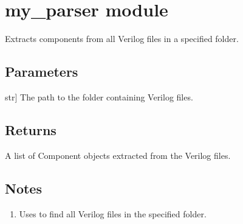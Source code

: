 \documentclass[letterpaper,10pt,english]{sphinxmanual}
\begin{document}
\sphinxstepscope


\section{my\_parser module}
\label{\detokenize{my_parser:module-my_parser}}\label{\detokenize{my_parser:my-parser-module}}\label{\detokenize{my_parser::doc}}

\begin{fulllineitems}
\label{\detokenize{my_parser:my_parser.extract_components}}
\pysigstartsignatures
{}
\pysigstopsignatures
\sphinxAtStartPar
Extracts components from all Verilog files in a specified folder.


\subsection{Parameters}
\label{\detokenize{my_parser:parameters}}\begin{description}
\sphinxlineitem{folder}{[}str{]}
\sphinxAtStartPar
The path to the folder containing Verilog files.

\end{description}


\subsection{Returns}
\label{\detokenize{my_parser:returns}}\begin{description}
\sphinxAtStartPar
A list of Component objects extracted from the Verilog files.

\end{description}


\subsection{Notes}
\label{\detokenize{my_parser:notes}}\begin{description}
\begin{enumerate}
%
\item {} 
\sphinxAtStartPar
Uses  to find all Verilog files in the specified folder.


\end{enumerate}
\end{description}
\end{fulllineitems}
\end{document}
